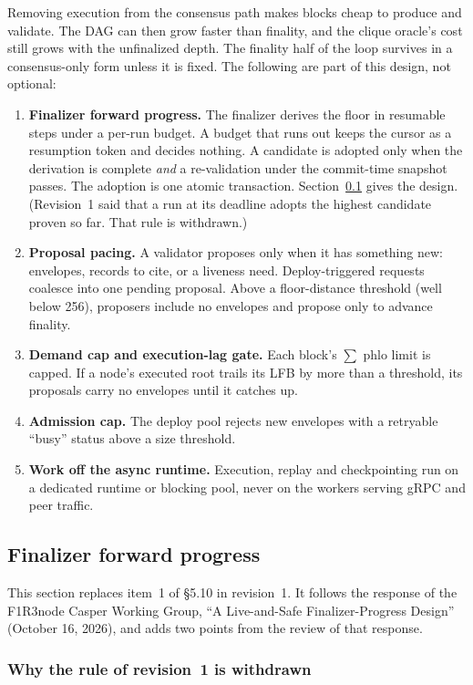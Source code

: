 \documentclass[11pt]{article}
\begin{document}
Removing execution from the consensus path makes blocks cheap to produce and validate. The DAG can then grow faster than finality, and the clique oracle's cost still grows with the unfinalized depth. The finality half of the loop survives in a consensus-only form unless it is fixed. The following are part of this design, not optional:
\begin{enumerate}
\item \textbf{Finalizer forward progress.} The finalizer derives the floor in resumable steps under a per-run budget. A budget that runs out keeps the cursor as a resumption token and decides nothing. A candidate is adopted only when the derivation is complete \emph{and} a re-validation under the commit-time snapshot passes. The adoption is one atomic transaction. Section~\ref{sec:finalizer} gives the design. (Revision~1 said that a run at its deadline adopts the highest candidate proven so far. That rule is withdrawn.)
\item \textbf{Proposal pacing.} A validator proposes only when it has something new: envelopes, records to cite, or a liveness need. Deploy-triggered requests coalesce into one pending proposal. Above a floor-distance threshold (well below 256), proposers include no envelopes and propose only to advance finality.
\item \textbf{Demand cap and execution-lag gate.} Each block's $\sum$ phlo limit is capped. If a node's executed root trails its LFB by more than a threshold, its proposals carry no envelopes until it catches up.
\item \textbf{Admission cap.} The deploy pool rejects new envelopes with a retryable ``busy'' status above a size threshold.
\item \textbf{Work off the async runtime.} Execution, replay and checkpointing run on a dedicated runtime or blocking pool, never on the workers serving gRPC and peer traffic.
\end{enumerate}

\subsection{Finalizer forward progress}\label{sec:finalizer}

This section replaces item~1 of \S5.10 in revision~1. It follows the response of the F1R3node Casper Working Group, ``A Live-and-Safe Finalizer-Progress Design'' (October 16, 2026), and adds two points from the review of that response.

\subsubsection*{Why the rule of revision~1 is withdrawn}
\end{document}
